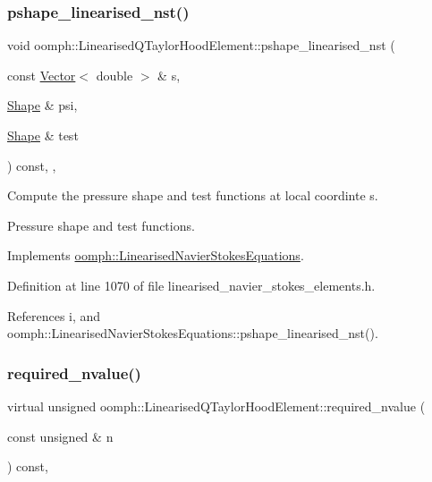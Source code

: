 \subsubsection{\texorpdfstring{pshape\+\_\+linearised\+\_\+nst()}{pshape\_linearised\_nst()}\hspace{0.1cm}{\footnotesize\ttfamily [2/2]}}
{\footnotesize\ttfamily void oomph\+::\+Linearised\+Q\+Taylor\+Hood\+Element\+::pshape\+\_\+linearised\+\_\+nst (\begin{DoxyParamCaption}\item[{const \hyperlink{classoomph_1_1Vector}{Vector}$<$ double $>$ \&}]{s,  }\item[{\hyperlink{classoomph_1_1Shape}{Shape} \&}]{psi,  }\item[{\hyperlink{classoomph_1_1Shape}{Shape} \&}]{test }\end{DoxyParamCaption}) const\hspace{0.3cm}{\ttfamily [inline]}, {\ttfamily [protected]}, {\ttfamily [virtual]}}



Compute the pressure shape and test functions at local coordinte s. 

Pressure shape and test functions. 

Implements \hyperlink{classoomph_1_1LinearisedNavierStokesEquations_a10130c3d5e96459201ef87b196427c60}{oomph\+::\+Linearised\+Navier\+Stokes\+Equations}.



Definition at line 1070 of file linearised\+\_\+navier\+\_\+stokes\+\_\+elements.\+h.



References i, and oomph\+::\+Linearised\+Navier\+Stokes\+Equations\+::pshape\+\_\+linearised\+\_\+nst().

\mbox{\label{classoomph_1_1LinearisedQTaylorHoodElement_ad91af0bc54b6c61cf43cbf867e939bc9}} 
\subsubsection{\texorpdfstring{required\+\_\+nvalue()}{required\_nvalue()}}
{\footnotesize\ttfamily virtual unsigned oomph\+::\+Linearised\+Q\+Taylor\+Hood\+Element\+::required\+\_\+nvalue (\begin{DoxyParamCaption}\item[{const unsigned \&}]{n }\end{DoxyParamCaption}) const\hspace{0.3cm}{\ttfamily [inline]}, {\ttfamily [virtual]}}



